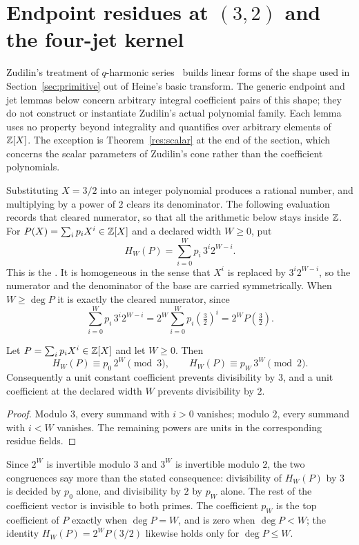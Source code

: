 \documentclass[11pt]{article}
\begin{document}
\section{Endpoint residues at $(3,2)$ and the four-jet
kernel}\label{sec:endpoints}

Zudilin's treatment of \(q\)-harmonic series~\cite{zudilin2004} builds linear
forms of the shape used in Section~\ref{sec:primitive} out of Heine's basic
transform.  The generic endpoint and jet lemmas below concern arbitrary
integral coefficient pairs of this shape; they do not construct or instantiate
Zudilin's actual polynomial family.  Each lemma uses no property beyond
integrality and quantifies over arbitrary elements of \(\mathbb{Z}[X]\).  The exception is
Theorem~\ref{res:scalar} at the end of the section, which concerns the scalar
parameters of Zudilin's cone rather than the coefficient polynomials.

Substituting \(X=3/2\) into an integer polynomial produces a rational number,
and multiplying by a power of \(2\) clears its denominator.  The following
evaluation records that cleared numerator, so that all the arithmetic below
stays inside \(\mathbb{Z}\).  For \(P(X)=\sum_i p_iX^i\in\mathbb{Z}[X]\) and a declared width
\(W\ge0\), put
\[
 H_W(P)=\sum_{i=0}^{W}p_i\,3^i2^{W-i}.
\]
This is the
.  It is homogeneous in the sense that \(X^{i}\) is
replaced by \(3^{i}2^{W-i}\), so the numerator and the denominator of the base
are carried symmetrically.  When \(W\ge\deg P\) it is exactly the cleared
numerator, since
\[
 \sum_{i=0}^{W}p_i\,3^i2^{W-i}=2^{W}\sum_{i=0}^{W}p_i\left(\tfrac32\right)^{i}
 =2^{W}P\!\left(\tfrac32\right).
\]

\begin{theorem}\label{res:endpoints}
Let \(P=\sum_ip_iX^i\in\mathbb{Z}[X]\) and let \(W\ge0\).  Then
\[
 H_W(P)\equiv p_0\,2^W\pmod 3,\qquad
 H_W(P)\equiv p_W\,3^W\pmod 2.
\]
Consequently a unit constant coefficient prevents divisibility by \(3\), and
a unit coefficient at the declared width \(W\) prevents divisibility by \(2\).
\end{theorem}

\begin{proof}
Modulo \(3\), every summand with \(i>0\) vanishes; modulo \(2\), every summand
with \(i<W\) vanishes.  The remaining powers are units in the corresponding
residue fields.
\end{proof}

Since \(2^{W}\) is invertible modulo \(3\) and \(3^{W}\) is invertible modulo
\(2\), the two congruences say more than the stated consequence: divisibility
of \(H_W(P)\) by \(3\) is decided by \(p_0\) alone, and divisibility by \(2\) by
\(p_W\) alone.  The rest of the coefficient vector is invisible to both primes.
The coefficient \(p_W\) is the top coefficient of \(P\) exactly when
\(\deg P=W\), and is zero when \(\deg P<W\); the identity
\(H_W(P)=2^{W}P(3/2)\) likewise holds only for \(\deg P\le W\).
\end{document}
